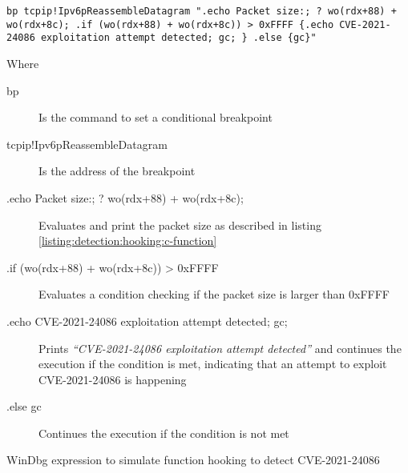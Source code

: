 \documentclass{report}
\begin{document}
\begin{listing}[H]
    \begin{verbatim}
bp tcpip!Ipv6pReassembleDatagram ".echo Packet size:; ? wo(rdx+88) + wo(rdx+8c); .if (wo(rdx+88) + wo(rdx+8c)) > 0xFFFF {.echo CVE-2021-24086 exploitation attempt detected; gc; } .else {gc}"
\end{verbatim}

Where

\begin{description}
    \item[bp] Is the command to set a conditional breakpoint
    \item[tcpip!Ipv6pReassembleDatagram] Is the address of the breakpoint
    \item[.echo Packet size:; ? wo(rdx+88) + wo(rdx+8c);] Evaluates and print the packet size as described in listing \ref{listing:detection:hooking:c-function}
    \item[.if (wo(rdx+88) + wo(rdx+8c)) > 0xFFFF] Evaluates a condition checking if the packet size is larger than 0xFFFF
    \item[{.echo CVE-2021-24086 exploitation attempt detected; gc; }] Prints \emph{``CVE-2021-24086 exploitation attempt detected''} and continues the execution if the condition is met, indicating that an attempt to exploit CVE-2021-24086 is happening
    \item[.else {gc}] Continues the execution if the condition is not met
\end{description}
\caption{WinDbg expression to simulate function hooking to detect CVE-2021-24086}
\label{listing:detection:hooking:windbg-bp}
\end{listing}
\end{document}

